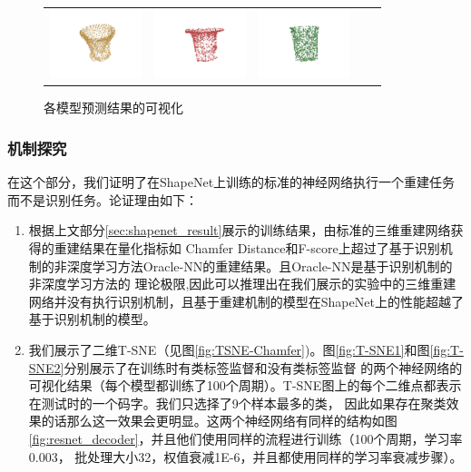 \documentclass[bachelor, nocolorlinks, printoneside]{seuthesis} %
\begin{document}
\begin{Main}
\begin{figure}[!h]
\begin{tabular}{c@{}c@{}c@{}c@{}c@{}}
    	\includegraphics[width=0.22\columnwidth,height=2cm]{figs/real_dataset/AE_label/jar_d56098d4d83f5976a2c59a4d90e63212_fine.png} &
    	\includegraphics[width=0.22\columnwidth,height=2cm]{figs/real_dataset/AE/jar_d56098d4d83f5976a2c59a4d90e63212_fine.png} &
    	\includegraphics[width=0.22\columnwidth,height=2cm]{figs/real_dataset/oracle/jar_d56098d4d83f5976a2c59a4d90e63212_oracle.png}
    	\\
    \end{tabular}
    \caption{\small 各模型预测结果的可视化}
    \label{fig:visualize_KC}
\end{figure}

\FloatBarrier
\subsubsection{机制探究}
在这个部分，我们证明了在ShapeNet上训练的标准的神经网络执行一个重建任务而不是识别任务。论证理由如下：
\begin{enumerate}
    \item 根据上文部分\ref{sec:shapenet_result}展示的训练结果，由标准的三维重建网络获得的重建结果在量化指标如
    Chamfer Distance和F-score上超过了基于识别机制的非深度学习方法Oracle-NN的重建结果。且Oracle-NN是基于识别机制的非深度学习方法的
    理论极限,因此可以推理出在我们展示的实验中的三维重建网络并没有执行识别机制，且基于重建机制的模型在ShapeNet上的性能超越了基于识别机制的模型。
    \item 我们展示了二维T-SNE（见图\ref{fig:TSNE-Chamfer})。图\ref{fig:T-SNE1}和图\ref{fig:T-SNE2}分别展示了在训练时有类标签监督和没有类标签监督
    的两个神经网络的可视化结果（每个模型都训练了100个周期）。T-SNE图上的每个二维点都表示在测试时的一个码字。我们只选择了9个样本最多的类，
    因此如果存在聚类效果的话那么这一效果会更明显。这两个神经网络有同样的结构如图\ref{fig:resnet_decoder}，并且他们使用同样的流程进行训练（100个周期，学习率0.003，
    批处理大小32，权值衰减1E-6，并且都使用同样的学习率衰减步骤）。


\end{enumerate}
\end{Main}
\end{document}
